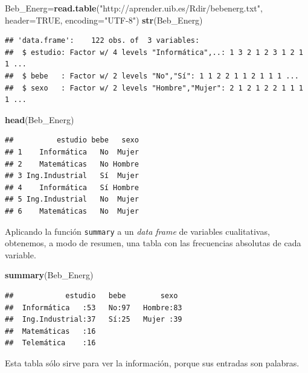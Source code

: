 \documentclass[]{book}
\newenvironment{Shaded}{\begin{snugshade}}{\end{snugshade}}
\newcommand{\DataTypeTok}[1]{\textcolor[rgb]{0.13,0.29,0.53}{#1}}
\newcommand{\KeywordTok}[1]{\textcolor[rgb]{0.13,0.29,0.53}{\textbf{#1}}}
\newcommand{\NormalTok}[1]{#1}
\newcommand{\OtherTok}[1]{\textcolor[rgb]{0.56,0.35,0.01}{#1}}
\newcommand{\StringTok}[1]{\textcolor[rgb]{0.31,0.60,0.02}{#1}}
\theoremstyle{definition}
\theoremstyle{definition}
\theoremstyle{definition}
\theoremstyle{remark}
\begin{document}
\begin{Shaded}
\begin{Highlighting}[]
\NormalTok{Beb_Energ=}\KeywordTok{read.table}\NormalTok{(}\StringTok{"http://aprender.uib.es/Rdir/bebenerg.txt"}\NormalTok{,  }\DataTypeTok{header=}\OtherTok{TRUE}\NormalTok{, }
                     \DataTypeTok{encoding=}\StringTok{"UTF-8"}\NormalTok{)}
\KeywordTok{str}\NormalTok{(Beb_Energ)}
\end{Highlighting}
\end{Shaded}

\begin{verbatim}
## 'data.frame':    122 obs. of  3 variables:
##  $ estudio: Factor w/ 4 levels "Informática",..: 1 3 2 1 2 3 1 2 1 1 ...
##  $ bebe   : Factor w/ 2 levels "No","Sí": 1 1 2 2 1 1 2 1 1 1 ...
##  $ sexo   : Factor w/ 2 levels "Hombre","Mujer": 2 1 2 1 2 2 1 1 1 1 ...
\end{verbatim}

\begin{Shaded}
\begin{Highlighting}[]
\KeywordTok{head}\NormalTok{(Beb_Energ)}
\end{Highlighting}
\end{Shaded}

\begin{verbatim}
##          estudio bebe   sexo
## 1    Informática   No  Mujer
## 2    Matemáticas   No Hombre
## 3 Ing.Industrial   Sí  Mujer
## 4    Informática   Sí Hombre
## 5 Ing.Industrial   No  Mujer
## 6    Matemáticas   No  Mujer
\end{verbatim}

Aplicando la función \texttt{summary} a un \emph{data frame} de variables cualitativas, obtenemos, a modo de resumen, una tabla con las frecuencias absolutas de cada variable.

\begin{Shaded}
\begin{Highlighting}[]
\KeywordTok{summary}\NormalTok{(Beb_Energ)}
\end{Highlighting}
\end{Shaded}

\begin{verbatim}
##            estudio   bebe        sexo   
##  Informática   :53   No:97   Hombre:83  
##  Ing.Industrial:37   Sí:25   Mujer :39  
##  Matemáticas   :16                      
##  Telemática    :16
\end{verbatim}

Esta tabla sólo sirve para ver la información, porque sus entradas son palabras.
\end{document}
